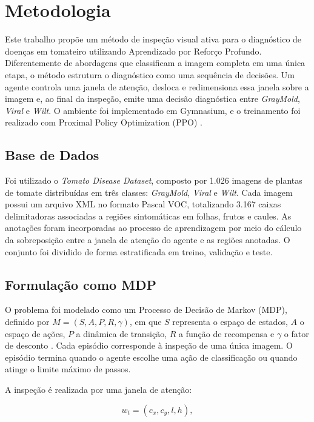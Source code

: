 \section{Metodologia}

Este trabalho propõe um método de inspeção visual ativa para o diagnóstico de doenças
em tomateiro utilizando Aprendizado por Reforço Profundo. Diferentemente de abordagens
que classificam a imagem completa em uma única etapa, o método estrutura o diagnóstico
como uma sequência de decisões. Um agente controla uma janela de atenção, desloca e
redimensiona essa janela sobre a imagem e, ao final da inspeção, emite uma decisão
diagnóstica entre \textit{GrayMold}, \textit{Viral} e \textit{Wilt}. O ambiente foi
implementado em Gymnasium, e o treinamento foi realizado com Proximal Policy
Optimization (PPO) \cite{schulman2017ppo}.

\subsection{Base de Dados}

Foi utilizado o \textit{Tomato Disease Dataset}, composto por 1.026 imagens de plantas
de tomate distribuídas em três classes: \textit{GrayMold}, \textit{Viral} e
\textit{Wilt}. Cada imagem possui um arquivo XML no formato Pascal VOC, totalizando
3.167 caixas delimitadoras associadas a regiões sintomáticas em folhas, frutos e
caules. As anotações foram incorporadas ao processo de aprendizagem por meio do cálculo
da sobreposição entre a janela de atenção do agente e as regiões anotadas. O conjunto
foi dividido de forma estratificada em treino, validação e teste.

\subsection{Formulação como MDP}

O problema foi modelado como um Processo de Decisão de Markov (MDP), definido por
$M = (S, A, P, R, \gamma)$, em que $S$ representa o espaço de estados, $A$ o espaço de
ações, $P$ a dinâmica de transição, $R$ a função de recompensa e $\gamma$ o fator de
desconto \cite{sutton2018,puterman1994}. Cada episódio corresponde à inspeção de uma
única imagem. O episódio termina quando o agente escolhe uma ação de classificação ou
quando atinge o limite máximo de passos.

A inspeção é realizada por uma janela de atenção:

\begin{equation}
w_t = (c_x, c_y, l, h),
\end{equation}

